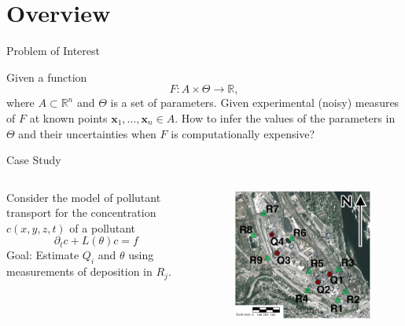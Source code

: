 \documentclass[11pt]{beamer}
\theoremstyle{plain}
\theoremstyle{definition}
\newcommand\ChangeFont{\fontsize{7}{7.2}\selectfont}
\begin{document}
\section{Overview}
\begin{frame}{Problem of Interest}

Given a function
\begin{equation*}
F:A\times\Theta\rightarrow \mathbb{R},
\end{equation*}
where $A\subset\mathbb{R}^{n}$ and $\Theta$ is a set of parameters. Given
experimental (noisy) measures of $F$ at known points $\textbf{x}_{1},\ldots,\textbf{x}_{n}\in A$.
How to infer the values of the parameters in $\Theta$ and their uncertainties when 
$F$ is computationally expensive?

\end{frame}

\begin{frame}{Case Study}

\begin{columns}[c]
\column{1.5in}
Consider the model of pollutant transport for the concentration $c(x,y,z,t)$ of a pollutant
\begin{equation*}
\partial_{t} c+L(\theta)c=f
\end{equation*}
Goal: Estimate $Q_{i}$ and $\theta$ using measurements of deposition in  $R_{j}$.
\column{1.5in}
\begin{figure}
\includegraphics[scale=0.36]{BCtrail}
\ChangeFont
\end{figure}

\end{columns}
\end{frame}
\end{document}
